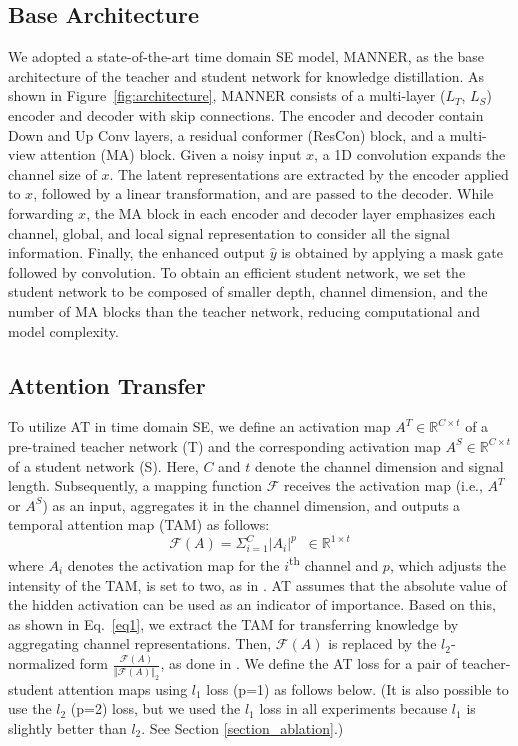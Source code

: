 \documentclass[a4paper]{article}
\begin{document}
\subsection{Base Architecture}
We adopted a state-of-the-art time domain SE model, MANNER, as the base architecture of the teacher and student network for knowledge distillation. As shown in Figure~\ref{fig:architecture}, MANNER consists of a multi-layer ($L_T$, $L_S$) encoder and decoder with skip connections. The encoder and decoder contain Down and Up Conv layers, a residual conformer (ResCon) block, and a multi-view attention (MA) block. Given a noisy input $x$, a 1D convolution expands the channel size of $x$. The latent representations are extracted by the encoder applied to $x$, followed by a linear transformation, and are passed to the decoder. While forwarding $x$, the MA block in each encoder and decoder layer emphasizes each channel, global, and local signal representation to consider all the signal information. Finally, the enhanced output $\hat{y}$ is obtained by applying a mask gate followed by convolution. To obtain an efficient student network, we set the student network to be composed of smaller depth, channel dimension, and the number of MA blocks than the teacher network, reducing computational and model complexity.
\newcommand\normx[1]{\left\Vert#1\right\Vert}   \subsection{Attention Transfer} \label{section:AT}
To utilize AT in time domain SE, we define an activation map $A^T \in \mathbb{R}^{C\times t}$ of a pre-trained teacher network (T) and the corresponding activation map $A^S \in \mathbb{R}^{C\times t}$ of a student network (S). Here, $C$ and $t$ denote the channel dimension and signal length. Subsequently, a mapping function $\mathcal{F}$ receives the activation map (i.e., $A^T$ or $A^S$) as an input, aggregates it in the channel dimension, and outputs a temporal attention map (TAM) as follows:
\begin{equation}
  \mathcal{F}(A) = \Sigma_{i=1}^{C} |A_i|^p \;\; \in \mathbb{R}^{1\times t}
  \label{eq1}
\end{equation}
where $A_i$ denotes the activation map for the $i$\textsuperscript{th} channel and $p$, which adjusts the intensity of the TAM, is set to two, as in \cite{zagoruyko2016paying}. AT assumes that the absolute value of the hidden activation can be used as an indicator of importance. Based on this, as shown in Eq.~\ref{eq1}, we extract the TAM for transferring knowledge by aggregating channel representations. Then, $\mathcal{F}(A)$ is replaced by the $l_2$-normalized form $\frac{\mathcal{F}(A)}{\normx{\mathcal{F}(A)}_2}$, as done in \cite{zagoruyko2016paying}. We define the AT loss for a pair of teacher-student attention maps using $l_1$ loss (p=1) as follows below. (It is also possible to use the $l_2$ (p=2) loss, but we used the $l_1$ loss in all experiments because $l_1$ is slightly better than $l_2$. See Section \ref{section_ablation}.)
\end{document}
